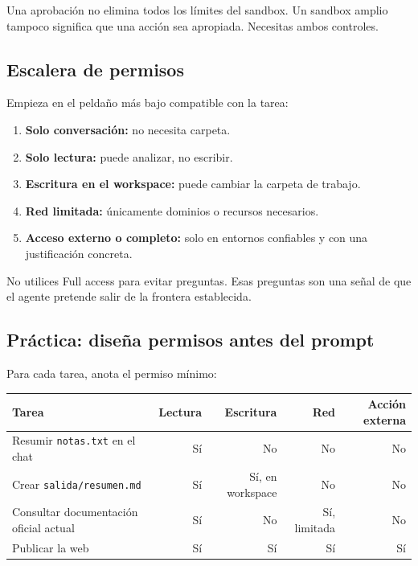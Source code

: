 \documentclass[10pt,a4paper,openany]{book}
\newcounter{none}
\providecommand{\tightlist}{\setlength{\itemsep}{0.18em}\setlength{\parskip}{0pt}}
\begin{document}
Una aprobación no elimina todos los límites del sandbox. Un sandbox
amplio tampoco significa que una acción sea apropiada. Necesitas ambos
controles.

\subsection{Escalera de permisos}\label{escalera-de-permisos}

Empieza en el peldaño más bajo compatible con la tarea:

\begin{enumerate}
\def\labelenumi{\arabic{enumi}.}
\tightlist
\item
  \textbf{Solo conversación:} no necesita carpeta.
\item
  \textbf{Solo lectura:} puede analizar, no escribir.
\item
  \textbf{Escritura en el workspace:} puede cambiar la carpeta de
  trabajo.
\item
  \textbf{Red limitada:} únicamente dominios o recursos necesarios.
\item
  \textbf{Acceso externo o completo:} solo en entornos confiables y con
  una justificación concreta.
\end{enumerate}

No utilices Full access para evitar preguntas. Esas preguntas son una
señal de que el agente pretende salir de la frontera establecida.

\subsection{Práctica: diseña permisos antes del
prompt}\label{pruxe1ctica-diseuxf1a-permisos-antes-del-prompt}

Para cada tarea, anota el permiso mínimo:

{\def\LTcaptype{none} %
\begin{longtable}[]{@{}lrrrr@{}}
\toprule\noalign{}
Tarea & Lectura & Escritura & Red & Acción externa \\
\midrule\noalign{}
\endhead
\bottomrule\noalign{}
\endlastfoot
Resumir \texttt{notas.txt} en el chat & Sí & No & No & No \\
Crear \texttt{salida/resumen.md} & Sí & Sí, en workspace & No & No \\
Consultar documentación oficial actual & Sí & No & Sí, limitada & No \\
Publicar la web & Sí & Sí & Sí & Sí \\
\end{longtable}
}
\end{document}
